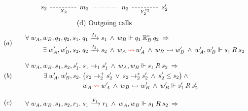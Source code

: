 \begin{figure}
\[\begin{array}{c}
\begin{tikzcd}[row sep=4.5ex, column sep=4.5ex]
        \\
        &&
        \\
        s_2 \ar[rr, "X_2"', dash, dashed] &&
        m_2 \ar[rr, dotted, dash] &&
        n_2 \ar[rr, "Y_2^{s_2}"', dash, dashed] &&
        s_2'
      \end{tikzcd}
      \vspace{1ex} \\
      \text{(d) Outgoing calls}
    \end{array}
  \]
  \vspace{1.5ex}
  \[
    \begin{array}{c@{\qquad}l}
      \vspace{2.8ex}
      (a) &
      {
        \begin{aligned}
          \forall\; w_A, w_B, q_1, q_2, s_1 .\;
          & q_1 \xrightarrow{I_1} s_1
          \:\wedge\:
          w_B \Vdash q_1 \mathbin{\mathbb{R}_B^\que} q_2 \:\Rightarrow
          \\
          \exists\; w'_A, w'_B, s_2.\;
          & q_2 \xrightarrow{I_2} s_2
          \:\wedge\:
          w_A \mathbin{\red{\envstep}} w'_A
          \:\wedge\:
          w_B \sysstep w'_B
          \:\wedge\:
          w'_A, w'_B \Vdash s_1 \mathbin{R} s_2
        \end{aligned}
      }
      \\
      \vspace{2.8ex}
      (b) &
      {
        \begin{aligned}
          \forall\; w_A, w_B, s_1, s_2, s_1' .\;
          & s_1 \rightarrow_1 s_1'
          \:\wedge\:
          w_A, w_B \Vdash s_1 \mathbin{R} s_2 \:\Rightarrow \\
          \exists\; w'_A, w'_B, s_2.\;
          & \bigl(s_2 \rightarrow^+_2 s_2'
            \:\vee\:
            s_2 \rightarrow^*_2 s_2'
            \:\wedge\:
            s_2' \le s_2
          \bigr) \:\wedge\: \\
          & w_A \mathbin{\red{\envstep}} w'_A
          \:\wedge\:
          w_B \sysstep w'_B
          \:\wedge\:
          w'_B \Vdash s_1' \mathbin{R} s_2'
        \end{aligned}
      }
      \\
      \vspace{2.8ex}
      (c) &
      {
        \begin{aligned}
          \forall\; w_A, w_B, s_1, s_2, r_1 .\;
          & s_1 \xrightarrow{F_1} r_1
          \:\wedge\:
          w_A, w_B \Vdash s_1 \mathbin{R} s_2 \:\Rightarrow \\

\end{aligned}}
\end{array}\]
\end{figure}
